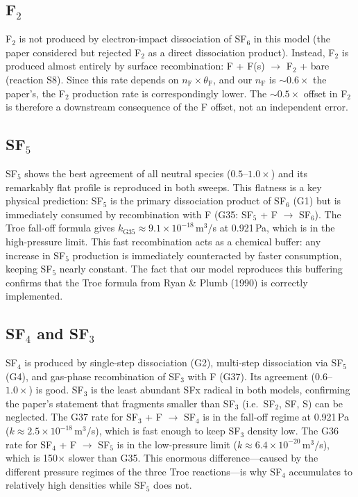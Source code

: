 \documentclass[11pt,a4paper]{article}
\begin{document}
\subsection{F$_2$}

F$_2$ is not produced by electron-impact dissociation of SF$_6$ in this model (the paper considered but rejected F$_2$ as a direct dissociation product). Instead, F$_2$ is produced almost entirely by surface recombination: F + F(s) $\to$ F$_2$ + bare (reaction S8). Since this rate depends on $n_\text{F} \times \theta_\text{F}$, and our $n_\text{F}$ is ${\sim}0.6\times$ the paper's, the F$_2$ production rate is correspondingly lower. The ${\sim}0.5\times$ offset in F$_2$ is therefore a downstream consequence of the F offset, not an independent error.

\subsection{SF$_5$}

SF$_5$ shows the best agreement of all neutral species ($0.5$--$1.0\times$) and its remarkably flat profile is reproduced in both sweeps. This flatness is a key physical prediction: SF$_5$ is the primary dissociation product of SF$_6$ (G1) but is immediately consumed by recombination with F (G35: SF$_5$ + F $\to$ SF$_6$). The Troe fall-off formula gives $k_\text{G35} \approx 9.1\times10^{-18}$\,m$^3$/s at 0.921\,Pa, which is in the high-pressure limit. This fast recombination acts as a chemical buffer: any increase in SF$_5$ production is immediately counteracted by faster consumption, keeping SF$_5$ nearly constant. The fact that our model reproduces this buffering confirms that the Troe formula from Ryan \& Plumb (1990) is correctly implemented.

\subsection{SF$_4$ and SF$_3$}

SF$_4$ is produced by single-step dissociation (G2), multi-step dissociation via SF$_5$ (G4), and gas-phase recombination of SF$_3$ with F (G37). Its agreement ($0.6$--$1.0\times$) is good. SF$_3$ is the least abundant SFx radical in both models, confirming the paper's statement that fragments smaller than SF$_3$ (i.e.\ SF$_2$, SF, S) can be neglected. The G37 rate for SF$_3$ + F $\to$ SF$_4$ is in the fall-off regime at 0.921\,Pa ($k \approx 2.5\times10^{-18}$\,m$^3$/s), which is fast enough to keep SF$_3$ density low. The G36 rate for SF$_4$ + F $\to$ SF$_5$ is in the low-pressure limit ($k \approx 6.4\times10^{-20}$\,m$^3$/s), which is 150$\times$ slower than G35. This enormous difference---caused by the different pressure regimes of the three Troe reactions---is why SF$_4$ accumulates to relatively high densities while SF$_5$ does not.
\end{document}
